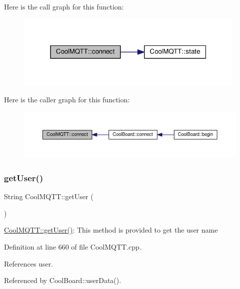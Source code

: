 Here is the call graph for this function\+:\nopagebreak
\begin{figure}[H]
\begin{center}
\leavevmode
\includegraphics[width=313pt]{classCoolMQTT_a50075d0ab23a327ab897fd6adad20eda_cgraph}
\end{center}
\end{figure}
Here is the caller graph for this function\+:\nopagebreak
\begin{figure}[H]
\begin{center}
\leavevmode
\includegraphics[width=350pt]{classCoolMQTT_a50075d0ab23a327ab897fd6adad20eda_icgraph}
\end{center}
\end{figure}
\mbox{\label{classCoolMQTT_a373cc92fca7760d886f02d8a6e5b3f63}} 
\subsubsection{\texorpdfstring{get\+User()}{getUser()}}
{\footnotesize\ttfamily String Cool\+M\+Q\+T\+T\+::get\+User (\begin{DoxyParamCaption}{ }\end{DoxyParamCaption})}

\hyperlink{classCoolMQTT_a373cc92fca7760d886f02d8a6e5b3f63}{Cool\+M\+Q\+T\+T\+::get\+User()}\+: This method is provided to get the user name 

Definition at line 660 of file Cool\+M\+Q\+T\+T.\+cpp.



References user.



Referenced by Cool\+Board\+::user\+Data().


